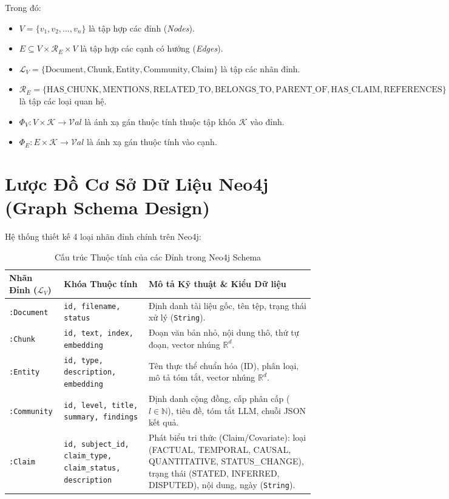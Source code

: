 \documentclass[11pt,a4paper]{report}
\begin{document}
Trong đó:
\begin{itemize}
    \item $V = \{v_1, v_2, \dots, v_n\}$ là tập hợp các đỉnh (\textit{Nodes}).
    \item $E \subseteq V \times \mathcal{R}_E \times V$ là tập hợp các cạnh có hướng (\textit{Edges}).
    \item $\mathcal{L}_V = \{\text{Document}, \text{Chunk}, \text{Entity}, \text{Community}, \text{Claim}\}$ là tập các nhãn đỉnh.
    \item $\mathcal{R}_E = \{\text{HAS\_CHUNK}, \text{MENTIONS}, \text{RELATED\_TO}, \text{BELONGS\_TO}, \text{PARENT\_OF}, \text{HAS\_CLAIM}, \text{REFERENCES}\}$ là tập các loại quan hệ.
    \item $\Phi_V: V \times \mathcal{K} \to \mathcal{V}al$ là ánh xạ gán thuộc tính thuộc tập khóa $\mathcal{K}$ vào đỉnh.
    \item $\Phi_E: E \times \mathcal{K} \to \mathcal{V}al$ là ánh xạ gán thuộc tính vào cạnh.
\end{itemize}

\section{Lược Đồ Cơ Sở Dữ Liệu Neo4j (Graph Schema Design)}
Hệ thống thiết kế 4 loại nhãn đỉnh chính trên Neo4j:

\begin{table}[h!]
\centering
\caption{Cấu trúc Thuộc tính của các Đỉnh trong Neo4j Schema}
\label{tab:node_schema}
\small
\begin{tabularx}{\textwidth}{>{\raggedright\arraybackslash}p{2.8cm} >{\raggedright\arraybackslash}p{3.8cm} X}
\toprule
\textbf{Nhãn Đỉnh ($\mathcal{L}_V$)} & \textbf{Khóa Thuộc tính} & \textbf{Mô tả Kỹ thuật \& Kiểu Dữ liệu} \\
\midrule
\texttt{:Document} & \texttt{id, filename, status} & Định danh tài liệu gốc, tên tệp, trạng thái xử lý (\texttt{String}). \\[0.2cm]
\texttt{:Chunk} & \texttt{id, text, index, embedding} & Đoạn văn bản nhỏ, nội dung thô, thứ tự đoạn, vector nhúng $\mathbb{R}^d$. \\[0.2cm]
\texttt{:Entity} & \texttt{id, type, description, embedding} & Tên thực thể chuẩn hóa (ID), phân loại, mô tả tóm tắt, vector nhúng $\mathbb{R}^d$. \\[0.2cm]
\texttt{:Community} & \texttt{id, level, title, summary, findings} & Định danh cộng đồng, cấp phân cấp ($l \in \mathbb{N}$), tiêu đề, tóm tắt LLM, chuỗi JSON kết quả. \\[0.2cm]
\texttt{:Claim} & \texttt{id, subject\_id, claim\_type, claim\_status, description} & Phát biểu tri thức (Claim/Covariate): loại (FACTUAL, TEMPORAL, CAUSAL, QUANTITATIVE, STATUS\_CHANGE), trạng thái (STATED, INFERRED, DISPUTED), nội dung, ngày (\texttt{String}). \\
\bottomrule
\end{tabularx}
\end{table}
\end{document}
